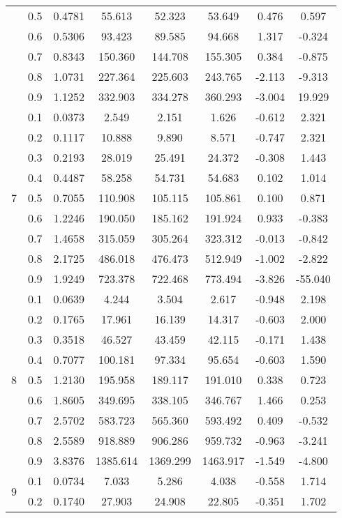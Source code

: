 \documentclass[11pt,a4paper]{report}
\begin{document}
\begin{longtable}{ | c | c || c | c | c | c | c | c | }
 & 0.5 & 0.4781 & 55.613 & 52.323 & 53.649 & 0.476 & 0.597 \\
 & 0.6 & 0.5306 & 93.423 & 89.585 & 94.668 & 1.317 & -0.324 \\
 & 0.7 & 0.8343 & 150.360 & 144.708 & 155.305 & 0.384 & -0.875 \\
 & 0.8 & 1.0731 & 227.364 & 225.603 & 243.765 & -2.113 & -9.313 \\
 & 0.9 & 1.1252 & 332.903 & 334.278 & 360.293 & -3.004 & 19.929 \\
 \hline
\multirow{9}{*}{7} & 0.1 & 0.0373 & 2.549 & 2.151 & 1.626 & -0.612 & 2.321 \\
 & 0.2 & 0.1117 & 10.888 & 9.890 & 8.571 & -0.747 & 2.321 \\
 & 0.3 & 0.2193 & 28.019 & 25.491 & 24.372 & -0.308 & 1.443 \\
 & 0.4 & 0.4487 & 58.258 & 54.731 & 54.683 & 0.102 & 1.014 \\
 & 0.5 & 0.7055 & 110.908 & 105.115 & 105.861 & 0.100 & 0.871 \\
 & 0.6 & 1.2246 & 190.050 & 185.162 & 191.924 & 0.933 & -0.383 \\
 & 0.7 & 1.4658 & 315.059 & 305.264 & 323.312 & -0.013 & -0.842 \\
 & 0.8 & 2.1725 & 486.018 & 476.473 & 512.949 & -1.002 & -2.822 \\
 & 0.9 & 1.9249 & 723.378 & 722.468 & 773.494 & -3.826 & -55.040 \\
 \hline
\multirow{9}{*}{8} & 0.1 & 0.0639 & 4.244 & 3.504 & 2.617 & -0.948 & 2.198 \\
 & 0.2 & 0.1765 & 17.961 & 16.139 & 14.317 & -0.603 & 2.000 \\
 & 0.3 & 0.3518 & 46.527 & 43.459 & 42.115 & -0.171 & 1.438 \\
 & 0.4 & 0.7077 & 100.181 & 97.334 & 95.654 & -0.603 & 1.590 \\
 & 0.5 & 1.2130 & 195.958 & 189.117 & 191.010 & 0.338 & 0.723 \\
 & 0.6 & 1.8605 & 349.695 & 338.105 & 346.767 & 1.466 & 0.253 \\
 & 0.7 & 2.5702 & 583.723 & 565.360 & 593.492 & 0.409 & -0.532 \\
 & 0.8 & 2.5589 & 918.889 & 906.286 & 959.732 & -0.963 & -3.241 \\
 & 0.9 & 3.8376 & 1385.614 & 1369.299 & 1463.917 & -1.549 & -4.800 \\
 \hline
\multirow{9}{*}{9} & 0.1 & 0.0734 & 7.033 & 5.286 & 4.038 & -0.558 & 1.714 \\
 & 0.2 & 0.1740 & 27.903 & 24.908 & 22.805 & -0.351 & 1.702 \\

\end{longtable}
\end{document}
